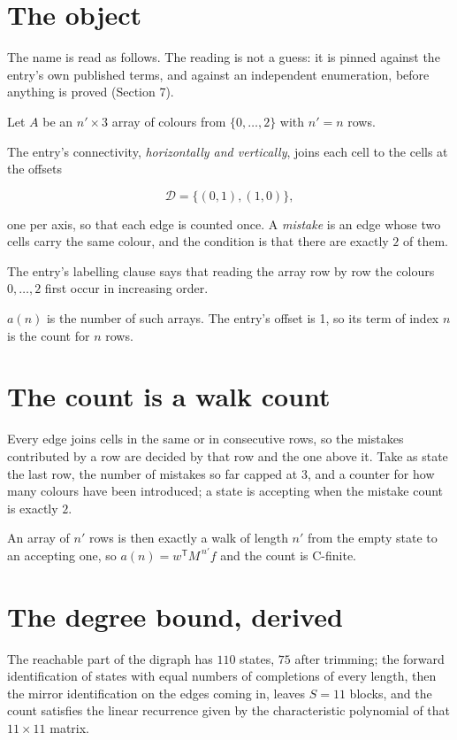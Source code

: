 \documentclass[11pt]{article}
\theoremstyle{definition}
\begin{document}
\section{The object}

The name is read as follows. The reading is not a guess: it is pinned against the entry's own published terms, and against an independent enumeration, before anything is proved (Section 7).

Let $A$ be an $n' \times 3$ array of colours from $\{0,\dots,2\}$ with $n' = n$ rows.

The entry's connectivity, {\itshape horizontally and vertically}, joins each cell to the cells at the offsets

\[\mathcal{D} = \{(0,1), (1,0)\},\]

one per axis, so that each edge is counted once. A {\itshape mistake} is an edge whose two cells carry the same colour, and the condition is that there are exactly $2$ of them.

The entry's labelling clause says that reading the array row by row the colours $0,\dots,2$ first occur in increasing order.

$a(n)$ is the number of such arrays. The entry's offset is 1, so its term of index $n$ is the count for $n$ rows.

\section{The count is a walk count}

Every edge joins cells in the same or in consecutive rows, so the mistakes contributed by a row are decided by that row and the one above it. Take as state the last row, the number of mistakes so far capped at $3$, and a counter for how many colours have been introduced; a state is accepting when the mistake count is exactly $2$.

An array of $n'$ rows is then exactly a walk of length $n'$ from the empty state to an accepting one, so $a(n) = w^{\mathsf T}M^{\,n'}f$ and the count is C-finite.

\section{The degree bound, derived}

The reachable part of the digraph has $110$ states, $75$ after trimming; the forward identification of states with equal numbers of completions of every length, then the mirror identification on the edges coming in, leaves $S = 11$ blocks, and the count satisfies the linear recurrence given by the characteristic polynomial of that $11\times11$ matrix.
\end{document}

